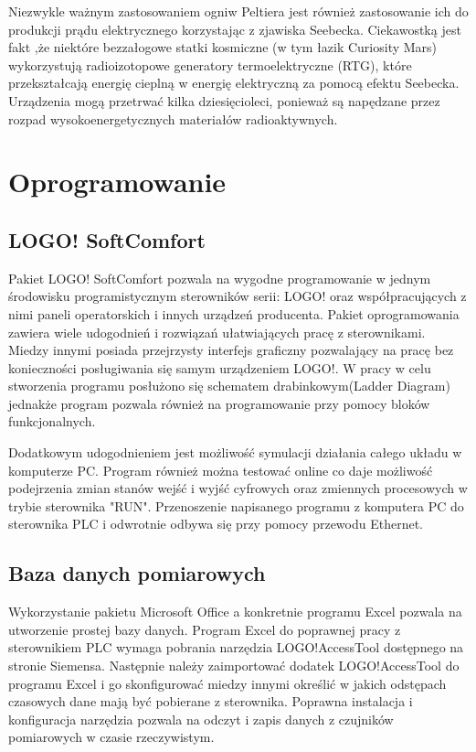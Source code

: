 \documentclass[oneside]{mgr}
\begin{document}
Niezwykle ważnym zastosowaniem ogniw Peltiera jest również zastosowanie ich do produkcji prądu elektrycznego korzystając z zjawiska Seebecka. Ciekawostką jest fakt ,że niektóre bezzałogowe statki kosmiczne (w tym łazik Curiosity Mars) wykorzystują radioizotopowe generatory termoelektryczne (RTG), które przekształcają energię cieplną w energię elektryczną za pomocą efektu Seebecka. Urządzenia mogą przetrwać kilka dziesięcioleci, ponieważ są napędzane przez rozpad wysokoenergetycznych materiałów radioaktywnych.

\chapter{Oprogramowanie}
\section{LOGO! SoftComfort}
Pakiet LOGO! SoftComfort pozwala na wygodne programowanie w jednym środowisku programistycznym sterowników serii: LOGO! oraz współpracujących z nimi paneli operatorskich i innych urządzeń producenta. Pakiet oprogramowania zawiera wiele udogodnień i rozwiązań ułatwiających pracę z sterownikami. Miedzy innymi posiada przejrzysty interfejs graficzny pozwalający na pracę bez konieczności posługiwania się samym urządzeniem LOGO!. W pracy w celu stworzenia programu posłużono się schematem drabinkowym(Ladder Diagram) jednakże program pozwala również na programowanie przy pomocy bloków funkcjonalnych.

Dodatkowym udogodnieniem jest możliwość symulacji działania całego układu w komputerze PC. Program również można testować online co daje możliwość podejrzenia zmian stanów wejść i wyjść cyfrowych oraz zmiennych procesowych w trybie sterownika "RUN". Przenoszenie napisanego programu z komputera PC do sterownika PLC i odwrotnie odbywa się przy pomocy przewodu Ethernet.

\section{Baza danych pomiarowych}
Wykorzystanie pakietu Microsoft Office a konkretnie programu Excel pozwala na utworzenie prostej bazy danych. Program Excel do poprawnej pracy z sterownikiem PLC wymaga pobrania narzędzia LOGO!AccessTool dostępnego na stronie Siemensa. Następnie należy zaimportować dodatek LOGO!AccessTool do programu Excel i go skonfigurować miedzy innymi określić w jakich odstępach czasowych dane mają być pobierane z sterownika.  Poprawna instalacja i konfiguracja narzędzia pozwala na odczyt i zapis danych z czujników pomiarowych w czasie rzeczywistym. 
\end{document}
